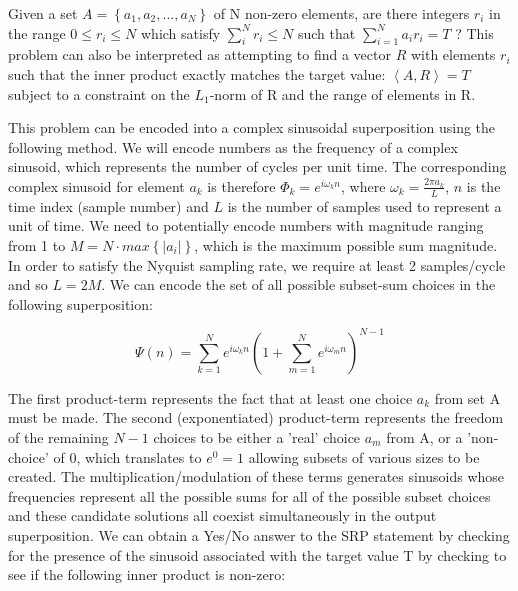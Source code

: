 \documentclass[reqno]{amsart}
\theoremstyle{definition}
\theoremstyle{remark}
\begin{document}
\newpage
\noindent
\newline
Given a set $A= \left \{a_1,a_2,...,a_N\right \}$ of N non-zero elements, are there integers $r_i$ in the range $ 0 \leq r_i \leq N$  which satisfy $ \sum_{i}^{N} r_i \leq N  $ such that $ \sum_{i=1}^{N} a_ir_i = T$ ?  This problem can also be interpreted as attempting to find a vector $R$ with elements $r_i$ such that the inner product exactly matches the target value: $\left \langle A, R\right \rangle = T$ subject to a constraint on the $L_1$-norm of R and the range of elements in R.

\noindent
\newline
This problem can be encoded into a  complex sinusoidal superposition using the following method.
We will encode numbers as the frequency of a complex sinusoid, which represents the number of cycles per unit time. The corresponding complex sinusoid for element $a_k$ is therefore $ \Phi _k = e^{ i \omega _k n }  $, where $\omega _k = \frac{2\pi a_k}{L} $, $n$ is the time index (sample number) and $L$ is the number of samples used to represent a unit of time.
We need to potentially encode numbers with magnitude ranging from 1 to $ M =N \cdot max  \left \{   \left | a_i  \right | \right \}$, which is the maximum possible sum magnitude. In order to satisfy the Nyquist sampling rate, we require at least 2 samples/cycle and so $L = 2M$. We can encode the set of all possible subset-sum choices in the following superposition:

\begin{equation}
\Psi (n) =\sum_{k=1}^{N}e^{i\omega _k n} \left (1+ \sum_{m=1}^{N}e^{i\omega _m n} \right )^{N-1}
\end{equation}


\noindent
\newline
The first product-term represents the fact that at least one choice $a_k$ from set A must be made. The second (exponentiated) product-term represents the freedom of the remaining $N-1$ choices to be either a 'real' choice $a_m$ from A, or a 'non-choice' of 0, which translates to $ e^0 = 1 $ allowing subsets of various sizes to be created. The multiplication/modulation of these terms generates sinusoids whose frequencies represent all the possible sums for all of the possible subset choices and these candidate solutions all coexist simultaneously in the output superposition. We can obtain a Yes/No answer to the SRP statement by checking for the presence of the sinusoid associated with the target value T by checking to see if the following inner product is non-zero:
\end{document}
